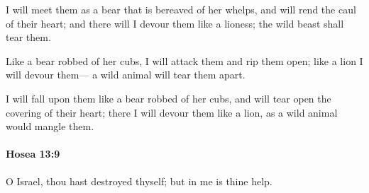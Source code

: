			\begin{versebox}
					\item[BHS] 
					\item[LXX] 
					\item[ASV] I will meet them as a bear that is bereaved of her whelps, and will rend the caul of their heart; and there will I devour them like a lioness; the wild beast shall tear them.
					\item[NIV] Like a bear robbed of her cubs, I will attack them and rip them open; like a lion I will devour them— a wild animal will tear them apart.
					\item[NRSV] I will fall upon them like a bear robbed of her cubs, and will tear open the covering of their heart; there I will devour them like a lion, as a wild animal would mangle them.
			\end{versebox}

		\paragraph{Hosea 13:9} %
			\label{HOSEA-13-9}

			O Israel, thou hast destroyed thyself; but in me is thine help.

